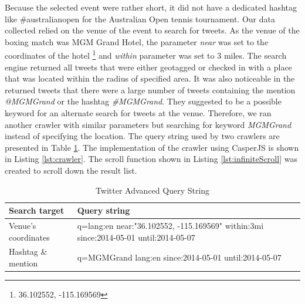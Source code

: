 Because the selected event were rather short, it did not have a dedicated hashtag like \#australianopen for the Australian Open tennis tournament. Our data collected relied on the venue of the event to search for tweets. As the venue of the boxing match was MGM Grand Hotel, the parameter \textit{near} was set to the coordinates of the hotel \footnote{36.102552, -115.169569} and \textit{within} parameter was set to 3 miles. The search engine returned all tweets that were either geotagged or checked in with a place that was located within the radius of specified area. It was also noticeable in the returned tweets that there were a large number of tweets containing the mention \textit{@MGMGrand} or the hashtag \textit{\#MGMGrand}. They suggested to be a possible keyword for an alternate search for tweets at the venue. Therefore, we ran another crawler with similar parameters but searching for keyword \textit{MGMGrand} instead of specifying the location. The query string used by two crawlers are presented in Table \ref{table:crawlerURL}. The implementation of the crawler using CasperJS is shown in Listing \ref{lst:crawler}. The scroll function shown in Listing \ref{lst:infiniteScroll} was created to scroll down the result list.

\begin{table}[!h]
\caption{Twitter Advanced Query String}
\label{table:crawlerURL}
\centering
\begin{tabular}{|p{3.5cm}|p{11cm}|}

\hline
\textbf{Search target} & \textbf{Query string} \\ \hline \hline
Venue's coordinates & q=lang:en near:"36.102552, -115.169569" within:3mi since:2014-05-01 until:2014-05-07 \\ \hline
Hashtag \& mention & q=MGMGrand lang:en since:2014-05-01 until:2014-05-07 \\ \hline

\end{tabular}
\end{table}

